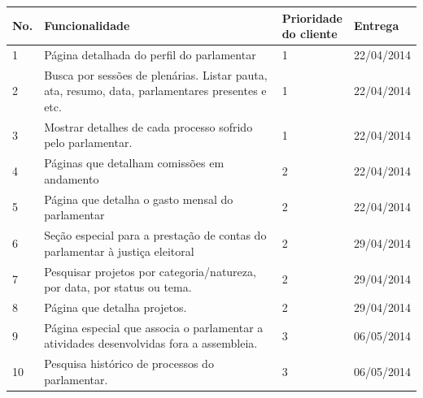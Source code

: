\documentclass[12pt, a4paper]{article}
\begin{document}
    \begin{longtabu}{X[-1, r] | X | X[-1, r] | X[-1]}
            \hline
            \textbf{No.} &
            \textbf{Funcionalidade} &
            \textbf{Prioridade \newline do cliente} &
            \textbf{Entrega}
            \\ \hline

            1 &
            Página detalhada do perfil do parlamentar &
            1 & 22/04/2014
            \\ \hline

            2 &
            Busca por sessões de plenárias. Listar pauta, ata, resumo, data,
            parlamentares presentes e etc. &
            1 & 22/04/2014
            \\ \hline

            3 &
            Mostrar detalhes de cada processo sofrido pelo parlamentar. &
            1 & 22/04/2014
            \\ \hline

            4 &
            Páginas que detalham comissões em andamento &
            2 & 22/04/2014
            \\ \hline

            5 &
            Página que detalha o gasto mensal do parlamentar
            & 2 & 22/04/2014
            \\ \hline

            6 &
            Seção especial para a prestação de contas do parlamentar à justiça
            eleitoral &
            2 & 29/04/2014
            \\ \hline

            7  &
            Pesquisar projetos por categoria/natureza, por data, por status ou
            tema. &
            2 & 29/04/2014
            \\ \hline

            8  &
            Página que detalha projetos. &
            2 & 29/04/2014
            \\ \hline

            9  &
            Página especial que associa o parlamentar a atividades
            desenvolvidas fora a assembleia. &
            3 & 06/05/2014
            \\ \hline

            10 &
            Pesquisa histórico de processos do parlamentar. &
            3 & 06/05/2014
            \\ \hline


\end{longtabu}
\end{document}
